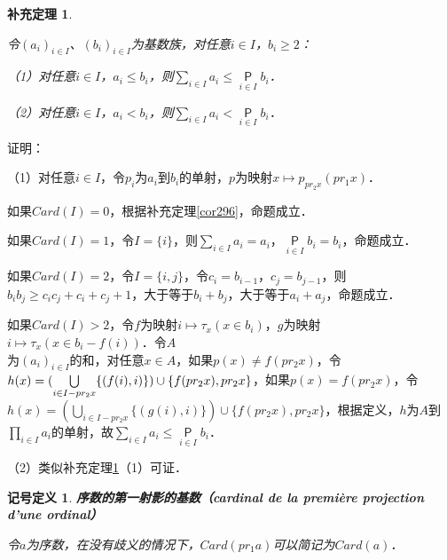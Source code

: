 \documentclass[12pt, a4paper, oneside]{book}
\newtheorem{sign}{记号定义}
\newtheorem{cor}{补充定理}
\begin{document}
			\begin{cor}\label{cor300}
				\hfill\par
				令$(a_i)_{i\in I}$、$(b_i)_{i\in I}$为基数族，对任意$i\in I$，$b_i\geq 2$：
				\par
				（1）对任意$i\in I$，$a_i\leq b_i$，则$\sum\limits_{i\in I}a_i\leq \mathop{\mathsf{P}}\limits_{i\in I}b_i$．
				\par
				（2）对任意$i\in I$，$a_i<b_i$，则$\sum\limits_{i\in I}a_i<\mathop{\mathsf{P}}\limits_{i\in I}b_i$．
			\end{cor}
			证明：
			\par
			（1）对任意$i\in I$，令$p_i$为$a_i$到$b_i$的单射，$p$为映射$x\mapsto p_{pr_2x}(pr_1x)$．
			\par
			如果$Card(I)=0$，根据补充定理\ref{cor296}，命题成立．
			\par
			如果$Card(I)=1$，令$I=\{i\}$，则$\sum\limits_{i\in I}a_i=a_i$，$\mathop{\mathsf{P}}\limits_{i\in I}b_i=b_i$，命题成立．
			\par
			如果$Card(I)=2$，令$I=\{i, j\}$，令$c_i=b_{i-1}$，$c_j=b_{j-1}$，则$b_ib_j\geq c_ic_j+c_i+c_j+1$，大于等于$b_i+b_j$，大于等于$a_i+a_j$，命题成立．
			\par
			如果$Card(I)>2$，令$f$为映射$i\mapsto \tau_x(x\in b_i)$，$g$为映射$i\mapsto \tau_x(x\in b_i-f(i))$．令$A$\\为$(a_i)_{i\in I}$的和，对任意$x\in A$，如果$p(x)\neq f(pr_2x)$，令$h(x)=(\bigcup\limits_{i\in I-pr_2x}\{(f(i), i)\})\cup\\\{f(pr_2x), pr_2x\}$，如果$p(x)=f(pr_2x)$，令$h(x)=(\bigcup\limits_{i\in I-pr_2x}\{(g(i), i)\})\cup\{f(pr_2x), pr_2x\}$，根据定义，$h$为$A$到$\prod\limits_{i\in I}a_i$的单射，故$\sum\limits_{i\in I}a_i\leq\mathop{\mathsf{P}}\limits_{i\in I}b_i$．
			\par
			（2）类似补充定理\ref{cor300}（1）可证．

			\begin{sign}
				\textbf{序数的第一射影的基数（cardinal de la première projection d'une ordinal）}
				\par
				令$a$为序数，在没有歧义的情况下，$Card(pr_1a)$可以简记为$Card(a)$．
			\end{sign}
			
\end{document}
